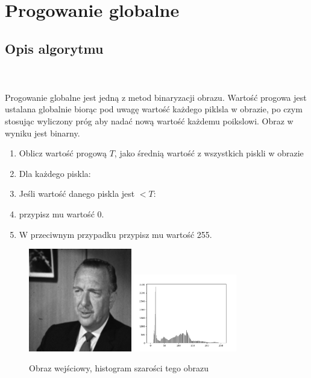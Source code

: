 \documentclass[final,a4paper,openany,12pt]{mwbk}
\begin{document}
\newpage
\clearpage




\section{Progowanie globalne}
\subsection*{Opis algorytmu}
\hfill
\\\\
\indent Progowanie globalne jest jedną z metod binaryzacji obrazu. Wartość progowa jest ustalana globalnie biorąc pod uwagę wartość każdego piklsla w obrazie, po czym stosując wyliczony próg aby nadać nową wartość każdemu poikslowi. Obraz w wyniku jest binarny.
\begin{enumerate}
	\item Oblicz wartość progową $T$, jako średnią wartość z wszystkich piskli w obrazie
	\item Dla każdego piskla:
	\item Jeśli wartość danego piskla jest $< T$:
	\item przypisz mu wartość $0$.
	\item W przeciwnym przypadku przypisz mu wartość 255.
\end{enumerate}

\begin{figure}[H]
	\begin{center}
		\includegraphics[width=0.4\textwidth]{gentelman_gray}
		\includegraphics[width=0.4\textwidth]{gentelman_gray_histogram}
	\end{center}
	\caption{Obraz wejściowy, histogram szarości tego obrazu}
\end{figure}
\end{document}
